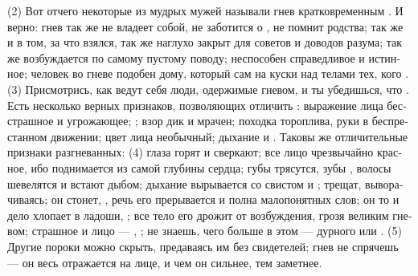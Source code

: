 (2) Вот отче­го неко­то­рые из муд­рых мужей назы­ва­ли гнев крат­ковре­мен­ным . И вер­но: гнев так же не вла­де­ет собой, не забо­тит­ся о , не пом­нит род­ства; так же  и  в том, за что взял­ся, так же наглу­хо закрыт для сове­тов и дово­дов разу­ма; так же воз­буж­да­ет­ся по само­му пусто­му пово­ду; неспо­со­бен  спра­вед­ли­вое и истин­ное;
чело­век во гне­ве подо­бен  дому, кото­рый сам  на кус­ки над тела­ми тех, кого .
(3) При­смот­рись, как ведут себя люди, одер­жи­мые гне­вом, и ты убедишь­ся, что . Есть несколь­ко вер­ных при­зна­ков, поз­во­ля­ю­щих отли­чить : выра­же­ние лица бес­страш­ное и угро­жаю­щее;  ; взор дик и мра­чен; поход­ка тороп­ли­ва, руки в бес­пре­стан­ном дви­же­нии; цвет лица необыч­ный; дыха­ние  и . Тако­вы же отли­чи­тель­ные при­зна­ки раз­гне­ван­ных:
(4) гла­за горят и свер­ка­ют; все лицо чрез­вы­чай­но крас­ное, ибо  под­ни­ма­ет­ся из самой глу­би­ны серд­ца; губы тря­сут­ся, зубы , воло­сы шеве­лят­ся и вста­ют дыбом; дыха­ние выры­ва­ет­ся со сви­стом и ;  тре­щат, выво­ра­чи­ва­ясь; он стонет, , речь его пре­ры­ва­ет­ся и пол­на мало­по­нят­ных слов; он то и дело хло­па­ет в ладо­ши, ; все тело его дро­жит от воз­буж­де­ния, гро­зя вели­ким гне­вом; страш­ное и  лицо --- , ; не зна­ешь, чего боль­ше в этом  --- дур­но­го или . (5) Дру­гие поро­ки мож­но скрыть, пре­да­ва­ясь им без свиде­те­лей; гнев не спря­чешь --- он весь отра­жа­ет­ся на лице, и чем он силь­нее, тем замет­нее.

